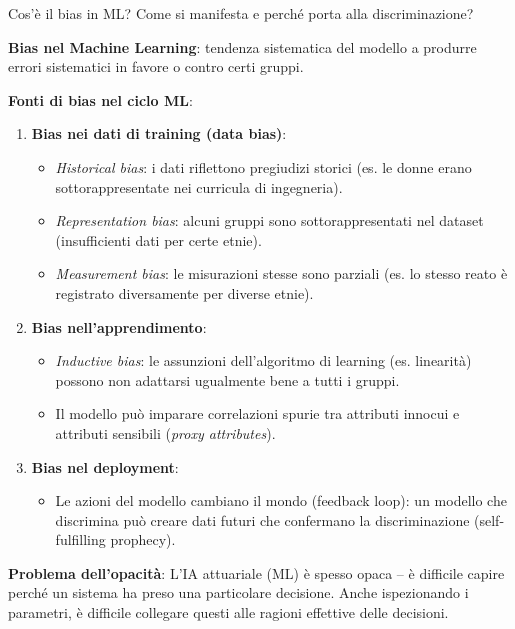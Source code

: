 \documentclass[a4paper,11pt]{article}
\begin{document}
\begin{domanda}
Cos'\`{e} il bias in ML? Come si manifesta e perch\'{e} porta alla discriminazione?
\end{domanda}

\textbf{Bias nel Machine Learning}: tendenza sistematica del modello a produrre errori sistematici in favore o contro certi gruppi.

\textbf{Fonti di bias nel ciclo ML}:
\begin{enumerate}
  \item \textbf{Bias nei dati di training (data bias)}:
  \begin{itemize}
    \item \emph{Historical bias}: i dati riflettono pregiudizi storici (es. le donne erano sottorappresentate nei curricula di ingegneria).
    \item \emph{Representation bias}: alcuni gruppi sono sottorappresentati nel dataset (insufficienti dati per certe etnie).
    \item \emph{Measurement bias}: le misurazioni stesse sono parziali (es. lo stesso reato \`{e} registrato diversamente per diverse etnie).
  \end{itemize}
  \item \textbf{Bias nell'apprendimento}:
  \begin{itemize}
    \item \emph{Inductive bias}: le assunzioni dell'algoritmo di learning (es. linearit\`{a}) possono non adattarsi ugualmente bene a tutti i gruppi.
    \item Il modello pu\`{o} imparare correlazioni spurie tra attributi innocui e attributi sensibili (\emph{proxy attributes}).
  \end{itemize}
  \item \textbf{Bias nel deployment}:
  \begin{itemize}
    \item Le azioni del modello cambiano il mondo (feedback loop): un modello che discrimina pu\`{o} creare dati futuri che confermano la discriminazione (self-fulfilling prophecy).
  \end{itemize}
\end{enumerate}

\textbf{Problema dell'opacit\`{a}}: L'IA attuariale (ML) \`{e} spesso opaca -- \`{e} difficile capire perch\'{e} un sistema ha preso una particolare decisione. Anche ispezionando i parametri, \`{e} difficile collegare questi alle ragioni effettive delle decisioni.
\end{document}
